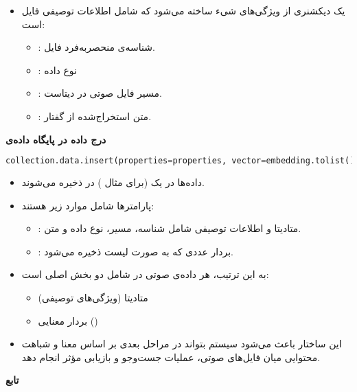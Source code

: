 \documentclass{article}
\begin{document}
\begin{itemize}
    \item یک دیکشنری از ویژگی‌های شیء ساخته می‌شود که شامل اطلاعات توصیفی فایل است:
    \begin{itemize}
        \item {}: شناسه‌ی منحصربه‌فرد فایل.
        \item {}: نوع داده
        \item {}: مسیر فایل صوتی در دیتاست.
        \item {}: متن استخراج‌شده از گفتار.
    \end{itemize}
\end{itemize}

\textbf{درج داده در پایگاه داده‌ی }

\begin{latin}
\begin{lstlisting}[language=Python]
collection.data.insert(properties=properties, vector=embedding.tolist())
\end{lstlisting}
\end{latin}

\begin{itemize}
    \item داده‌ها در یک  (برای مثال ) در  ذخیره می‌شوند.  
    \item پارامترها شامل موارد زیر هستند:  
    \begin{itemize}
        \item {}: متادیتا و اطلاعات توصیفی شامل شناسه، مسیر، نوع داده و متن.  
        \item {}: بردار عددی  که به صورت لیست ذخیره می‌شود.  
    \end{itemize}
    \item به این ترتیب، هر داده‌ی صوتی در  شامل دو بخش اصلی است:  
    \begin{itemize}
        \item متادیتا (ویژگی‌های توصیفی)
        \item بردار معنایی ()
    \end{itemize}
    \item این ساختار باعث می‌شود سیستم بتواند در مراحل بعدی بر اساس معنا و شباهت محتوایی میان فایل‌های صوتی، عملیات جست‌وجو و بازیابی مؤثر انجام دهد.
\end{itemize}


\textbf{تابع }
\end{document}
